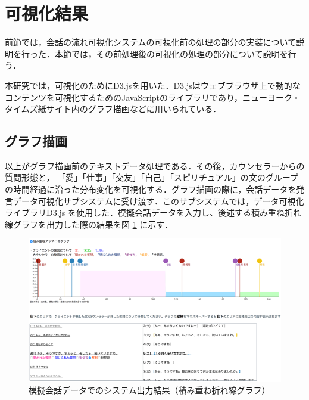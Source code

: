 \documentclass[shuuron]{kuee}
\begin{document}

\section{可視化結果}

前節では，会話の流れ可視化システムの可視化前の処理の部分の実装について説明を行った．本節では，その前処理後の可視化の処理の部分について説明を行う．





本研究では，可視化のためにD3.js\cite{vand3}を用いた．D3.jsはウェブブラウザ上で動的なコンテンツを可視化するためのJavaScriptのライブラリであり，ニューヨーク・タイムズ紙サイト内のグラフ描画などに用いられている．




\subsection{グラフ描画}
以上がグラフ描画前のテキストデータ処理である．その後，カウンセラーからの質問形態と， 「愛」「仕事」「交友」「自己」「スピリチュアル」の文のグループの時間経過に沿った分布変化を可視化する．グラフ描画の際に，会話データを発言データ可視化サブシステムに受け渡す．このサブシステムでは，データ可視化ライブラリD3.js
\cite{bostock2012d3}
を使用した．模擬会話データを入力し、後述する積み重ね折れ線グラフを出力した際の結果を図
\ref{fig:6_1}
に示す．
\begin{figure}
  \begin{center}
    \includegraphics[width=\linewidth]{6_1.png}
  \end{center}
  \caption{模擬会話データでのシステム出力結果（積み重ね折れ線グラフ）}
  \label{fig:6_1}
\end{figure}
\end{document}
